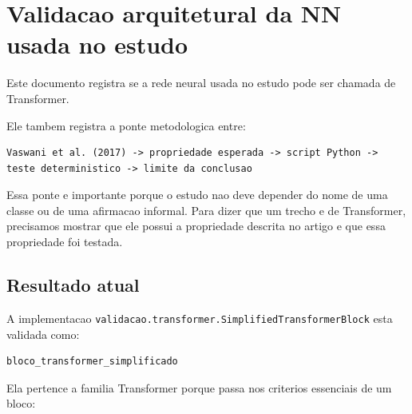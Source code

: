 

\chapter{Validacao arquitetural da NN usada no estudo}




Este documento registra se a rede neural usada no estudo pode ser chamada de Transformer.



Ele tambem registra a ponte metodologica entre:



\begin{Verbatim}[fontsize=\small,breaklines=true,label=text]
Vaswani et al. (2017) -> propriedade esperada -> script Python -> teste deterministico -> limite da conclusao
\end{Verbatim}






Essa ponte e importante porque o estudo nao deve depender do nome de uma classe ou de uma afirmacao informal. Para dizer que um trecho e de Transformer, precisamos mostrar que ele possui a propriedade descrita no artigo e que essa propriedade foi testada.



\section{Resultado atual}




A implementacao \texttt{validacao.\allowbreak{}transformer.\allowbreak{}Simplified\allowbreak{}Transformer\allowbreak{}Block} esta validada como:



\begin{Verbatim}[fontsize=\small,breaklines=true,label=text]
bloco_transformer_simplificado
\end{Verbatim}




Ela pertence a familia Transformer porque passa nos criterios essenciais de um bloco:


